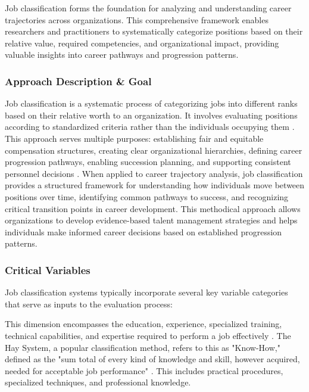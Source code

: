 \documentclass[../main.tex]{subfiles}
\begin{document}
Job classification forms the foundation for analyzing and understanding career trajectories across organizations. This comprehensive framework enables researchers and practitioners to systematically categorize positions based on their relative value, required competencies, and organizational impact, providing valuable insights into career pathways and progression patterns.

\subsubsection{Approach Description \& Goal}

Job classification is a systematic process of categorizing jobs into different ranks based on their relative worth to an organization. It involves evaluating positions according to standardized criteria rather than the individuals occupying them \cite{aihr2024}. This approach serves multiple purposes: establishing fair and equitable compensation structures, creating clear organizational hierarchies, defining career progression pathways, enabling succession planning, and supporting consistent personnel decisions \cite{aihr2024, bamboohr2024}. When applied to career trajectory analysis, job classification provides a structured framework for understanding how individuals move between positions over time, identifying common pathways to success, and recognizing critical transition points in career development. This methodical approach allows organizations to develop evidence-based talent management strategies and helps individuals make informed career decisions based on established progression patterns.

\subsubsection{Critical Variables}

Job classification systems typically incorporate several key variable categories that serve as inputs to the evaluation process:

This dimension encompasses the education, experience, specialized training, technical capabilities, and expertise required to perform a job effectively \cite{peoplebox2024, synergogy2024}. The Hay System, a popular classification method, refers to this as "Know-How," defined as the "sum total of every kind of knowledge and skill, however acquired, needed for acceptable job performance" \cite{waterloo2024}. This includes practical procedures, specialized techniques, and professional knowledge.
\end{document}
